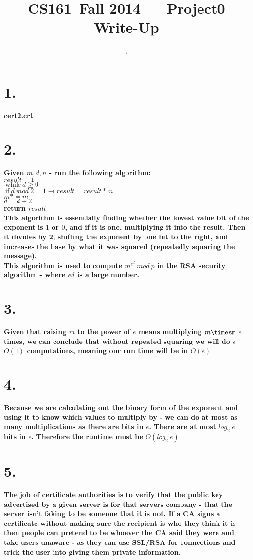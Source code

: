 \documentclass[11pt]{article}
\title{CS161--Fall 2014 --- Project0 Write-Up}
\author{\Name, \texttt{\Login}}
\begin{document}
\maketitle

\section*{1.}
\textbf{cert2.crt}
\section*{2.}
\textbf{Given $m,d,n$ - run the following algorithm:\\
$result = 1$\\
$\ \text{while} \ d \geq 0$ \\ 
$\ \text{if} \ d\ mod\ 2=1 \rightarrow result = result * m$ \\
$m *= m$ \\
$d =d \div 2$ \\
return $result$ \\[3pt]
This algorithm is essentially finding whether the lowest value bit of the exponent is $1$ or $0$, and if it is one, multiplying it into the result. Then it divides by 2, shifting the exponent by one bit to the right, and increases the base by what it was squared (repeatedly squaring the message).\\
This algorithm is used to compute $m^e^d \ mod\ p$ in the RSA security algorithm - where $ed$ is a large number.
}

\section*{3.}
\textbf{Given that raising $m$ to the power of $e$ means multiplying $m\timesm$ $e$ times, we can conclude that without repeated squaring we will do $e$ $O(1)$ computations, meaning our run time will be in $O(e)$}
\section*{4.}
\textbf{Because we are calculating out the binary form of the exponent and using it to know which values to multiply by - we can do at most as many multiplications as there are bits in $e$. There are at most $log_2\ e$ bits in $e$. Therefore the runtime must be $O(log_2\ e)$}
\section*{5.}
\textbf{The job of certificate authorities is to verify that the public key advertised by a given server is for that servers company - that the server isn't faking to be someone that it is not. If a CA signs a certificate without making sure the recipient is who they think it is then people can pretend to be whoever the CA said they were and take users unaware - as they can use SSL/RSA for connections and trick the user into giving them private information.}
\end{document}

